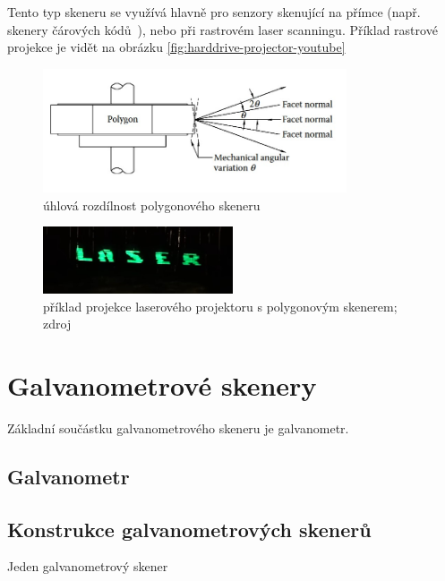 Tento typ skeneru se využívá hlavně pro senzory skenující na přímce (např. skenery čárových kódů~\cite{history-of-barcode-scanning}), nebo při rastrovém laser scanningu. Příklad rastrové projekce je vidět na obrázku \ref{fig:harddrive-projector-youtube}

\begin{figure}[!htb]
  \centering
  \includegraphics[width=0.8\textwidth]{img/polygon-angular-variation.jpg}
  \caption{\label{fig:polygon-angular-variation} úhlová rozdílnost polygonového skeneru}
\end{figure}


\begin{figure}[!htb]
  \centering
  \includegraphics[width=0.5\textwidth]{img/harddrive-projection.jpg}
  \caption{\label{fig:harddrive-projection} příklad projekce laserového projektoru s polygonovým skenerem; zdroj \cite{harddrive-projector-youtube}}
\end{figure}

\section{Galvanometrové skenery}

Základní součástku galvanometrového skeneru je galvanometr.

\subsection{Galvanometr~\cite{some stuff}}      

\subsection{Konstrukce galvanometrových skenerů}
Jeden galvanometrový skener 

